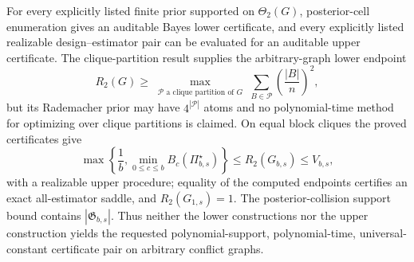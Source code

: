 For every explicitly listed finite prior supported on \(\Theta_2(G)\), posterior-cell enumeration gives an auditable Bayes lower certificate, and every explicitly listed realizable design--estimator pair can be evaluated for an auditable upper certificate. The clique-partition result supplies the arbitrary-graph lower endpoint
\[
R_2(G)\geq
\max_{\substack{\mathcal P\text{ a clique partition of }G}}
\sum_{B\in\mathcal P}\left(\frac{|B|}{n}\right)^2,
\]
but its Rademacher prior may have \(4^{|\mathcal P|}\) atoms and no polynomial-time method for optimizing over clique partitions is claimed. On equal block cliques the proved certificates give
\[
\max\left\{\frac1b,\min_{0\leq c\leq b}B_c(\Pi_{b,s}^{\star})\right\}
\leq R_2(G_{b,s})\leq V_{b,s},
\]
with a realizable upper procedure; equality of the computed endpoints certifies an exact all-estimator saddle, and \(R_2(G_{1,s})=1\). The posterior-collision support bound contains \(|\mathfrak G_{b,s}|\). Thus neither the lower constructions nor the upper construction yields the requested polynomial-support, polynomial-time, universal-constant certificate pair on arbitrary conflict graphs.